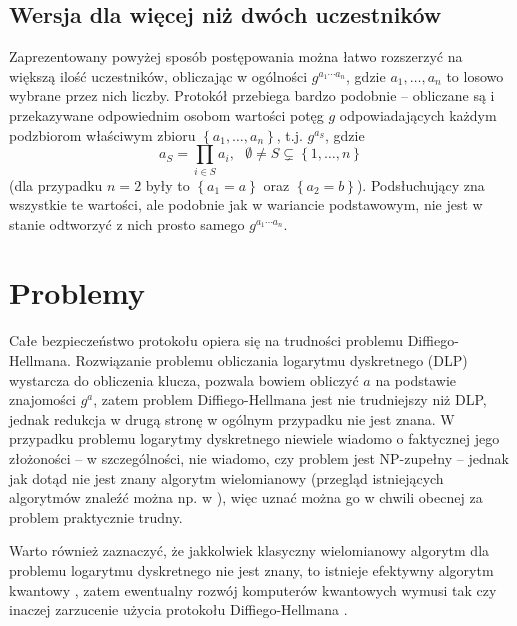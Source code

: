 \documentclass[10pt]{article}
\begin{document}
\subsection{Wersja dla więcej niż dwóch uczestników}

Zaprezentowany powyżej sposób postępowania można łatwo rozszerzyć na większą ilość uczestników,
obliczając w ogólności \(g^{a_1 \cdots a_n}\), gdzie \(a_1,\ldots,a_n\) to losowo wybrane przez nich
liczby. Protokół przebiega bardzo podobnie -- obliczane są i przekazywane odpowiednim osobom
wartości potęg \(g\) odpowiadających każdym podzbiorom właściwym zbioru 
\(\left\{a_1,\ldots,a_n\right\}\), t.j. \(g^{a_S}\), gdzie
\[
a_S = \prod_{i\in S}a_i,\ \ \ 
\emptyset\neq S\varsubsetneq \left\{1,\ldots,n\right\}
\]
(dla przypadku \(n=2\) były to \(\left\{a_1=a\right\}\) oraz
\(\left\{a_2=b\right\}\)). Podsłuchujący zna wszystkie te wartości, ale podobnie jak w wariancie
podstawowym, nie jest w stanie odtworzyć z nich prosto samego \(g^{a_1 \cdots a_n}\).

\section{Problemy}

Całe bezpieczeństwo protokołu opiera się na trudności problemu Diffiego-Hellmana. Rozwiązanie 
problemu obliczania logarytmu dyskretnego (DLP) wystarcza do obliczenia klucza, pozwala 
bowiem obliczyć \(a\) na podstawie znajomości \(g^a\), zatem problem Diffiego-Hellmana jest nie 
trudniejszy niż DLP, jednak redukcja w drugą stronę w ogólnym przypadku nie jest znana\footnotemark.
W przypadku problemu logarytmy dyskretnego niewiele wiadomo o faktycznej jego złożoności -- w
szczególności, nie wiadomo, czy problem jest NP-zupełny -- jednak jak dotąd nie jest znany algorytm
wielomianowy (przegląd istniejących algorytmów znaleźć można np. w \cite{Sutherland07}), więc uznać
można go w chwili obecnej za problem praktycznie trudny.


Warto również zaznaczyć, że jakkolwiek klasyczny wielomianowy algorytm dla problemu logarytmu 
dyskretnego nie jest znany, to istnieje efektywny algorytm kwantowy \cite{Shor97}, zatem ewentualny 
rozwój komputerów kwantowych wymusi tak czy inaczej zarzucenie użycia protokołu Diffiego-Hellmana
\footnotemark.




\nocite{*}



\end{document}
